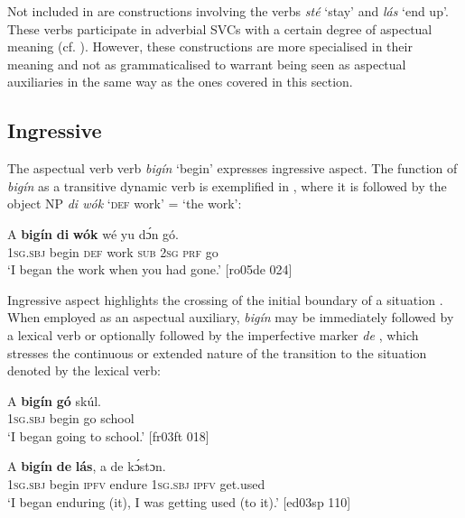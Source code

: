 Not included in  are constructions involving the verbs \textit{sté} ‘stay’ and \textit{lás} ‘end up’. These verbs participate in adverbial SVCs with a certain degree of aspectual meaning (cf. ). However, these constructions are more specialised in their meaning and not as grammaticalised to warrant being seen as aspectual auxiliaries in the same way as the ones covered in this section.

\subsection{Ingressive}\label{sec:6.4.1}

The aspectual verb verb \textit{bigín} ‘begin’ expresses ingressive aspect. The function of \textit{bigín} as a transitive dynamic verb is exemplified in , where it is followed by the object \textsc{NP} \textit{di wók} ‘\textsc{def} work’ = ‘the work’: 


\ea%
    \label{ex:key:349}
    \gll A    \textbf{bigín}  \textbf{di}  \textbf{wók}   wé  yu  dɔ́n  gó.\\
\textsc{1sg.sbj}  begin  \textsc{def}  work  \textsc{sub}  \textsc{2sg}  \textsc{prf}  go\\

\glt ‘I began the work when you had gone.’ [ro05de 024]
\z

Ingressive aspect highlights the crossing of the initial boundary of a situation . When employed as an aspectual auxiliary, \textit{bigín} may be immediately followed by a lexical verb  or optionally followed by the imperfective marker \textit{de} , which stresses the continuous or extended nature of the transition to the situation denoted by the lexical verb:


\ea%
    \label{ex:key:350}
    \gll \MakeUppercase{A}   \textbf{bigín}  \textbf{gó}  skúl.\\
\textsc{1sg.sbj}  begin  go  school\\

\glt ‘I began going to school.’ [fr03ft 018]
\z


\ea%
    \label{ex:key:351}
    \gll A    \textbf{bigín} \textbf{de}  \textbf{lás},    a    de  kɔ́stɔn.\\
\textsc{1sg.sbj}  begin  \textsc{ipfv}  endure  \textsc{1sg.sbj}  \textsc{ipfv}  get.used\\

\glt ‘I began enduring (it), I was getting used (to it).’ [ed03sp 110]
\z

